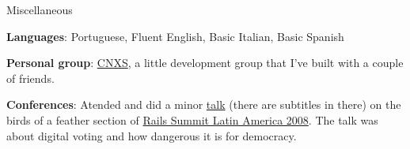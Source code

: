 \begin{rubric}{Miscellaneous} 

    \entry* \textbf{Languages}: Portuguese, Fluent English, Basic Italian, Basic
    Spanish

    \entry* \textbf{Personal group}: \href{http://www.cnxs.com.br}{CNXS}, a
    little development group that I've built with a couple of friends.

    \entry* \textbf{Conferences}: Atended and did a minor
    \href{http://www.cnxs.com.br/posts/eduardo-bellani-on-rails-summit-latin-america-2008}{talk}
    (there are subtitles in there) on the birds of a feather section of
    \href{http://www.locaweb.com.br/railssummit/default.asp?language=7}{Rails
    Summit Latin America 2008}. The talk was about digital voting and how
    dangerous it is for democracy.
        
\end{rubric}
